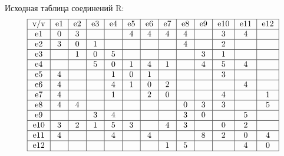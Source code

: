 \documentclass{article}
\begin{document}
\itmo[
  variant=161,
  labn=3,
  worktype=Домашняя работа,
  discipline=Дискретная математика,
  group=P3115,
  student=Владимир Мацюк,
  teacher=Поляков Владимир Иванович,
  logo=../../lib/img/itmo.png
]



Исходная таблица соединений R:
$$\begin{tabular}{|c|c|c|c|c|c|c|c|c|c|c|c|c|c|c|c|c|c|c|c|c|c|c|c|} \hline v/v & e1 & e2 & e3 & e4 & e5 & e6 & e7 & e8 & e9 & e10 & e11 & e12 \nl e1 & 0 & 3 &  &  & 4 & 4 & 4 & 4 &  & 3 & 4 &  \nl e2 & 3 & 0 & 1 &  &  &  &  & 4 &  & 2 &  &  \nl e3 &  & 1 & 0 & 5 &  &  &  &  & 3 & 1 &  &  \nl e4 &  &  & 5 & 0 & 1 & 4 & 1 &  & 4 & 5 & 4 &  \nl e5 & 4 &  &  & 1 & 0 & 1 &  &  &  & 3 &  &  \nl e6 & 4 &  &  & 4 & 1 & 0 & 2 &  &  &  & 4 &  \nl e7 & 4 &  &  & 1 &  & 2 & 0 &  &  & 4 &  & 1 \nl e8 & 4 & 4 &  &  &  &  &  & 0 & 3 & 3 &  & 5 \nl e9 &  &  & 3 & 4 &  &  &  & 3 & 0 &  & 5 &  \nl e10 & 3 & 2 & 1 & 5 & 3 &  & 4 & 3 &  & 0 & 2 &  \nl e11 & 4 &  &  & 4 &  & 4 &  &  & 8 & 2 & 0 & 4 \nl e12 &  &  &  &  &  &  & 1 & 5 &  &  & 4 & 0\nl \end{tabular}$$
\end{document}
